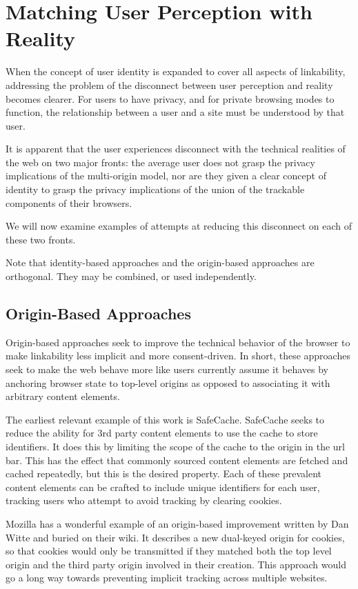\documentclass[letterpaper,11pt]{llncs}
\begin{document}
\section{Matching User Perception with Reality}

When the concept of user identity is expanded to cover all aspects of
linkability, addressing the problem of the disconnect between user perception
and reality becomes clearer. For users to have privacy, and for private
browsing modes to function, the relationship between a user and a site must be
understood by that user.

It is apparent that the user experiences disconnect with the technical
realities of the web on two major fronts: the average user does not grasp the
privacy implications of the multi-origin model, nor are they given a clear
concept of identity to grasp the privacy implications of the union of the
trackable components of their browsers.

We will now examine examples of attempts at reducing this disconnect on each
of these two fronts.

Note that identity-based approaches and the origin-based approaches are
orthogonal. They may be combined, or used independently.

\subsection{Origin-Based Approaches}

Origin-based approaches seek to improve the technical behavior of the browser
to make linkability less implicit and more consent-driven. In short, these
approaches seek to make the web behave more like users currently assume it
behaves by anchoring browser state to top-level origins as opposed to
associating it with arbitrary content elements.

The earliest relevant example of this work is SafeCache\cite{safecache}.
SafeCache seeks to reduce the ability for 3rd party content elements to use
the cache to store identifiers. It does this by limiting the scope of the
cache to the origin in the url bar. This has the effect that commonly sourced
content elements are fetched and cached repeatedly, but this is the desired
property. Each of these prevalent content elements can be crafted to include
unique identifiers for each user, tracking users who attempt to avoid tracking
by clearing cookies.

Mozilla has a wonderful example of an origin-based improvement written by Dan
Witte and buried on their wiki\cite{thirdparty}. It describes a new dual-keyed
origin for cookies, so that cookies would only be transmitted if they matched
both the top level origin and the third party origin involved in their
creation. This approach would go a long way towards preventing implicit
tracking across multiple websites.
\end{document}
